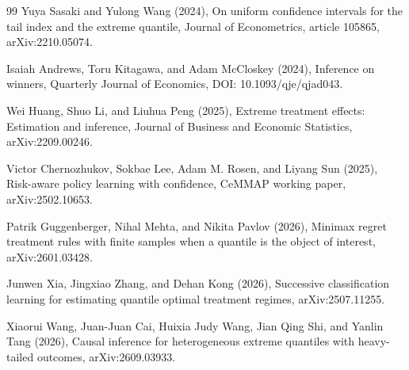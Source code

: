 \documentclass{article}
\begin{document}
\begin{thebibliography}{99}
   Yuya Sasaki and Yulong Wang (2024), On uniform confidence intervals for the tail index and the extreme quantile, Journal of Econometrics, article 105865, arXiv:2210.05074.

   Isaiah Andrews, Toru Kitagawa, and Adam McCloskey (2024), Inference on winners, Quarterly Journal of Economics, DOI: 10.1093/qje/qjad043.

   Wei Huang, Shuo Li, and Liuhua Peng (2025), Extreme treatment effects: Estimation and inference, Journal of Business and Economic Statistics, arXiv:2209.00246.

   Victor Chernozhukov, Sokbae Lee, Adam M. Rosen, and Liyang Sun (2025), Risk-aware policy learning with confidence, CeMMAP working paper, arXiv:2502.10653.

   Patrik Guggenberger, Nihal Mehta, and Nikita Pavlov (2026), Minimax regret treatment rules with finite samples when a quantile is the object of interest, arXiv:2601.03428.

   Junwen Xia, Jingxiao Zhang, and Dehan Kong (2026), Successive classification learning for estimating quantile optimal treatment regimes, arXiv:2507.11255.

   Xiaorui Wang, Juan-Juan Cai, Huixia Judy Wang, Jian Qing Shi, and Yanlin Tang (2026), Causal inference for heterogeneous extreme quantiles with heavy-tailed outcomes, arXiv:2609.03933.

\end{thebibliography}
\end{document}
